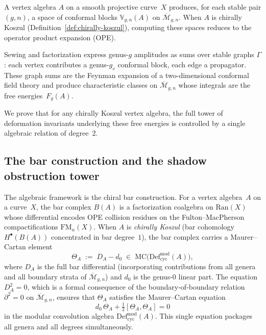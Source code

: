 \documentclass[11pt]{article}
\theoremstyle{plain}
\theoremstyle{definition}
\theoremstyle{remark}
\newcommand{\Defcyc}{\mathrm{Def}_{\mathrm{cyc}}}
\newcommand{\Ran}{\mathrm{Ran}}
\newcommand{\Mbar}{\overline{\mathcal{M}}}
\newcommand{\FM}{\mathrm{FM}}
\newcommand{\MC}{\mathrm{MC}}
\begin{document}
A vertex algebra $A$ on a smooth projective curve~$X$ produces,
for each stable pair $(g,n)$, a space of conformal blocks
$\mathbb{V}_{g,n}(A)$ on $\Mbar_{g,n}$. When $A$ is chirally
Koszul (Definition~\ref{def:chirally-koszul}), computing these
spaces reduces to the operator product expansion (OPE).

Sewing and factorization express genus-$g$ amplitudes as sums over
stable graphs $\Gamma$: each vertex contributes a genus-$g_v$
conformal block, each edge a propagator. These graph sums are
the Feynman expansion of a two-dimensional conformal field theory
and produce characteristic classes on $\Mbar_{g,n}$ whose
integrals are the free energies~$F_g(A)$.

We prove that for any chirally Koszul vertex algebra, the full
tower of deformation invariants underlying these free energies
is controlled by a single algebraic relation of degree~$2$.


\subsection{The bar construction and the shadow obstruction tower}

The algebraic framework is the chiral bar construction.
For a vertex algebra~$A$ on a curve~$X$, the bar complex $B(A)$
is a factorization coalgebra on $\Ran(X)$ whose differential
encodes OPE collision residues on the Fulton--MacPherson
compactifications $\FM_n(X)$. When $A$ is \emph{chirally Koszul}
(bar cohomology $H^{\bullet}(B(A))$ concentrated in bar
degree~$1$), the bar complex carries a Maurer--Cartan element
\[
 \Theta_A \;:=\; D_A - d_0
 \;\in\; \MC\bigl(\Defcyc^{\mathrm{mod}}(A)\bigr),
\]
where $D_A$ is the full bar differential (incorporating
contributions from all genera and all boundary strata of
$\Mbar_{g,n}$) and $d_0$ is the genus-$0$ linear part.
The equation $D_A^2 = 0$, which is a formal consequence of the
boundary-of-boundary relation $\partial^2 = 0$ on $\Mbar_{g,n}$,
ensures that $\Theta_A$ satisfies the Maurer--Cartan equation
\begin{equation}\label{eq:intro-mc}
 d_0\,\Theta_A + \tfrac{1}{2}[\Theta_A, \Theta_A] = 0
\end{equation}
in the modular convolution algebra
$\Defcyc^{\mathrm{mod}}(A)$. This single equation packages
all genera and all degrees simultaneously.
\end{document}
